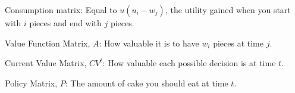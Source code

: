 Consumption matrix: Equal to $u(u_i - w_j)$, the utility gained when you start with $i$ pieces and end with $j$ pieces.

Value Function Matrix, $A$: How valuable it is to have $w_i$ pieces at time $j$.

Current Value Matrix, $CV^t$: How valuable each possible decision is at time $t$.

Policy Matrix, $P$: The amount of cake you should eat at time $t$.














